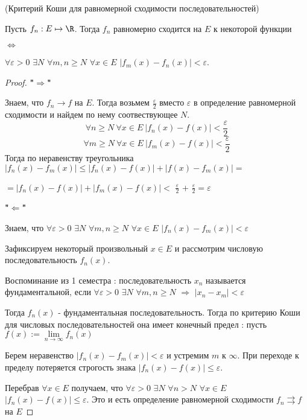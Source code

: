 
\begin{theorem} (Критерий Коши для равномерной сходимости последовательностей) \thmslashn
	
	\begin{center} {Пусть $f_n : E \mapsto \R$. Тогда $f_n$ равномерно сходится на $E$ к некоторой функции} \end{center}
	
	\begin{center} $\Longleftrightarrow$ \end{center}
	
	\begin{center} $\forall \varepsilon > 0$ $\exists N$ $\forall m,n \ge N$ $\forall x \in E$ $|f_m(x) - f_n(x)| < \varepsilon$. \end{center}
	\begin{proof} \thmslashn
		
		\textbf{"$\Longrightarrow$"}
		
		Знаем, что $f_n \rightarrow f$ на $E$. Тогда возьмем $\displaystyle \frac{\varepsilon}{2}$ вместо $\varepsilon$ в определение равномерной сходимости и найдем по нему соотвествующее $N$.
		$$\forall n \ge N \: \forall x \in E \: |f_n(x) - f(x)| < \frac{\varepsilon}{2}$$
		$$\forall m \ge N \: \forall x \in E \: |f_m(x) - f(x)| < \frac{\varepsilon}{2}$$
		Тогда по неравенству треугольника $|f_n(x) - f_m(x)| \le |f_n(x) - f(x)| + |f(x) - f_m(x)| =$ 
		
		$= |f_n(x) - f(x)| + |f_m(x) - f(x)| < $ $\displaystyle \frac{\varepsilon}{2}$ $+$ $ \displaystyle \frac{\varepsilon}{2} = \varepsilon$
		
		\textbf{"$\Longleftarrow$"}
		
		Знаем, что $\forall \varepsilon > 0$ $\exists N$ $\forall m,n \ge N$ $\forall x \in E$ $|f_n(x) - f_m(x)| < \varepsilon$
		
		Зафиксируем некоторый произвольный $x \in E$ и рассмотрим числовую последовательность $f_n(x)$. 
		\begin{remark}
			Воспоминание из 1 семестра : последовательность $x_n$ называется фундаментальной, если $\forall \varepsilon > 0$ $\exists N$ $\forall m,n \ge N$ $\Longrightarrow$ $|x_n - x_m| < \varepsilon$
		\end{remark}
		
		Тогда $f_n(x)$ - фундаментальная последовательность. Тогда по критерию Коши для числовых последовательностей она имеет конечный предел : пусть $f(x) := \lim\limits_{n \rightarrow \infty} f_n(x)$
		
		Берем неравенство $|f_n(x) - f_m(x)| < \varepsilon$ и устремим $m$ к $\infty$. При переходе к пределу потеряется строгость знака $|f_n(x) - f(x)| \le \varepsilon$.
		
		Перебрав $\forall x \in E$ получаем, что $\forall \varepsilon > 0$ $\exists N$ $\forall n > N$ $\forall x \in E$ $|f_n(x) - f(x)| \le \varepsilon$. Это и есть определение равномерной сходимости $f_n \rightrightarrows f$ на $E$
	\end{proof}
\end{theorem}